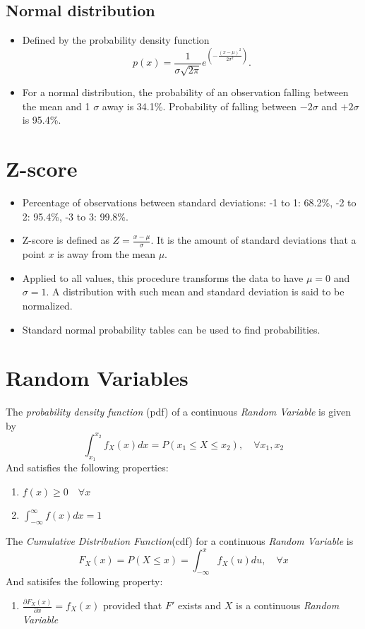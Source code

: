 \documentclass[a4paper,11pt,dvipsnames]{book}
\begin{document}
\subsection*{Normal distribution}

\begin{itemize}
\item Defined by the probability density function $$p(x) = \frac{1}{\sigma\sqrt{2\pi}}e^{(-\frac{(x-\mu)^2}{2\sigma^2})}.$$
\item For a normal distribution, the probability of an observation falling between the mean and 1 $\sigma$ away is 34.1\%. Probability of falling between $-2\sigma$ and $+2\sigma$ is 95.4\%.
\end{itemize}

\section*{Z-score}
\begin{itemize}
\item Percentage of observations between standard deviations: -1 to 1: 68.2\%, -2 to 2: 95.4\%, -3 to 3: 99.8\%.
\item Z-score is defined as $Z = \frac{x-\mu}{\sigma}$. It is the amount of standard deviations that a point $x$ is away from the mean $\mu$.
\item Applied to all values, this procedure transforms the data to have $\mu=0$ and $\sigma=1$. A distribution with such mean and standard deviation is said to be normalized.
\item Standard normal probability tables can be used to find probabilities.
\end{itemize}


\section*{Random Variables}
The \emph{probability density function} (pdf) of a continuous \emph{Random Variable} is given by 
$$\int_{x_1}^{x_2}f_X(x)dx=P(x_1\leq X\leq x_2), \quad \forall x_1,x_2$$
And satisfies the following properties:
\begin{enumerate}
\item $f(x)\geq 0 \quad \forall x$
\item $\int_{-\infty}^{\infty}f(x)dx=1$
\end{enumerate}

The \emph{Cumulative Distribution Function}(cdf) for a continuous \emph{Random Variable} is 
$$F_X(x)=P(X \leq x) = \int_{-\infty}^{x}f_X(u)du, \quad \forall x$$
And satisifes the following property:
\begin{enumerate}
\item $\frac{\partial F_X(x)}{\partial x}=f_X(x)$ provided that $F'$ exists and $X$ is a continuous \emph{Random Variable}
\end{enumerate}
\end{document}
